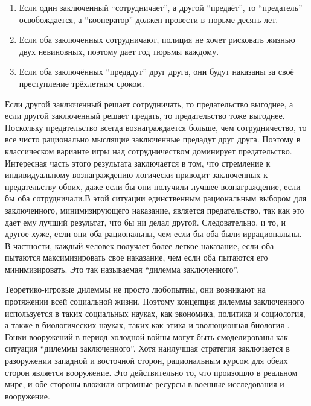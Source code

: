 \begin{enumerate}
\item
  Если один заключенный ``сотрудничает'', а другой ``предаёт'', то
  ``предатель'' освобождается, а ``кооператор'' должен провести в тюрьме
  десять лет.
\item
  Если оба заключенных сотрудничают, полиция не хочет рисковать жизнью
  двух невиновных, поэтому дает год тюрьмы каждому.
\item
  Если оба заключённых ``предадут'' друг друга, они будут наказаны за
  своё преступление трёхлетним сроком.
\end{enumerate}

Если другой заключенный решает сотрудничать, то предательство выгоднее,
а если другой заключенный решает предать, то предательство тоже
выгоднее. Поскольку предательство всегда вознаграждается больше, чем
сотрудничество, то все чисто рационально мыслящие заключенные предадут
друг друга. Поэтому в классическом варианте игры над сотрудничеством
доминирует предательство. Интересная часть этого результата заключается
в том, что стремление к индивидуальному вознаграждению логически
приводит заключенных к предательству обоих, даже если бы они получили
лучшее вознаграждение, если бы оба сотрудничали.В этой ситуации
единственным рациональным выбором для заключенного, минимизирующего
наказание, является предательство, так как это дает ему лучший
результат, что бы ни делал другой. Следовательно, и то, и другое хуже,
если они оба рациональны, чем если бы оба были иррациональны. В
частности, каждый человек получает более легкое наказание, если оба
пытаются максимизировать свое наказание, чем если оба пытаются его
минимизировать. Это так называемая ``дилемма заключенного''.

Теоретико-игровые дилеммы не просто любопытны, они возникают на
протяжении всей социальной жизни. Поэтому концепция дилеммы заключенного
используется в таких социальных науках, как экономика, политика и
социология, а также в биологических науках, таких как этика и
эволюционная биология \cite{Howard:1971}. Гонки вооружений в период холодной
войны могут быть смоделированы как ситуация ``дилеммы заключенного''.
Хотя наилучшая стратегия заключается в разоружении западной и восточной
сторон, рациональным курсом для обеих сторон является вооружение. Это
действительно то, что произошло в реальном мире, и обе стороны вложили
огромные ресурсы в военные исследования и вооружение.


